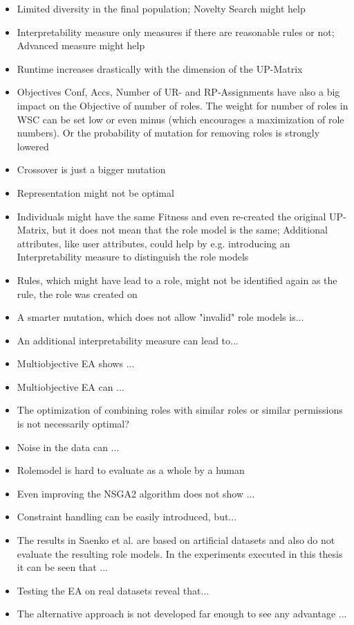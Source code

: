 \begin{itemize}
\item Limited diversity in the final population; Novelty Search might help
\item Interpretability measure only measures if there are reasonable rules or not; Advanced measure might help
\item Runtime increases drastically with the dimension of the UP-Matrix
\item Objectives Conf, Accs, Number of UR- and RP-Assignments have also a big impact on the Objective of number of roles. The weight for number of roles in WSC can be set low or even minus (which encourages a maximization of role numbers). Or the probability of mutation for removing roles is strongly lowered
\item Crossover is just a bigger mutation
\item Representation might not be optimal
\item Individuals might have the same Fitness and even re-created the original UP-Matrix, but it does not mean that the role model is the same; Additional attributes, like user attributes, could help by e.g. introducing an Interpretability measure to distinguish the role models
\item Rules, which might have lead to a role, might not be identified again as the rule, the role was created on
\item A smarter mutation, which does not allow "invalid" role models is...
\item An additional interpretability measure can lead to...
\item Multiobjective EA shows ...
\item Multiobjective EA can ...
\item The optimization of combining roles with similar roles or similar permissions is not necessarily optimal?
\item Noise in the data can ...
\item Rolemodel is hard to evaluate as a whole by a human
\item Even improving the NSGA2 algorithm does not show ...
\item Constraint handling can be easily introduced, but...
\item The results in Saenko et al. are based on artificial datasets and also do not evaluate the resulting role models. In the experiments executed in this thesis it can be seen that ...
\item Testing the EA on real datasets reveal that...
\item The alternative approach is not developed far enough to see any advantage ...
\end{itemize}